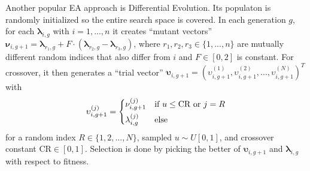 \documentclass[twoside,11pt]{article}
\begin{document}
Another popular EA approach is Differential Evolution. Its populaton is randomly initialized so the entire search space is covered.
In each generation $g$, for each $\boldsymbol\lambda_{i,g}$ with $i=1,...,n$ it creates ``mutant vectors''
$\boldsymbol\nu_{i,g+1}=\boldsymbol\lambda_{r_1,g}+F\cdot(\boldsymbol\lambda_{r_2,g}-\boldsymbol\lambda_{r_3,g})$,
where $r_1,r_2,r_3\in\{1,...,n\}$ are mutually different random indices that also differ from $i$ and $F\in[0,2]$ is constant.
For crossover, it then generates a ``trial vector'' $\boldsymbol\upsilon_{i,g+1}=(\upsilon_{i,g+1}^{(1)},\upsilon_{i,g+1}^{(2)},...,\upsilon_{i,g+1}^{(N)})^T$ with
\begin{equation}
  \upsilon_{i,g+1}^{(j)} = \begin{dcases}
    \nu_{i,g+1}^{(j)} & \text{if } u\le\text{CR}\text{ or } j=R \\
    \lambda_{i,g}^{(j)} & \text{else}
  \end{dcases}
\end{equation}
for a random index $R\in\{1,2,...,N\}$, sampled $u\sim U[0,1]$, and crossover constant $\text{CR}\in[0,1]$.
Selection is done by picking the better of $\boldsymbol\upsilon_{i,g+1}$ and $\boldsymbol\lambda_{i,g}$ with respect to fitness. \citep[p. 343]{differential_evolution}
\end{document}
